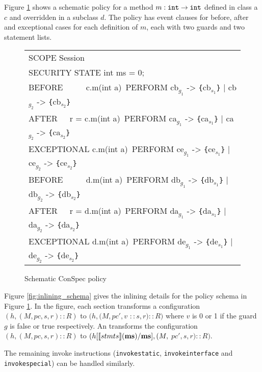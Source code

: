 \documentclass[10pt,twocolumn]{article}
\newcommand{\MS}{{\bf ms}}
\begin{document}
Figure \ref{fig:schematic_conspec} shows a schematic policy for a method $m : {\tt int} \rightarrow {\tt int}$ defined in class a $c$ and overridden in a subclass $d$. The policy has event clauses for {\sc before}, {\sc after} and {\sc exceptional} cases for each definition of $m$, each with two guards and two statement lists. 
\begin{figure}[h]
\centering
{\scriptsize\ttfamily
\begin{tabular}{@{}l@{}}
SCOPE Session\\
SECURITY STATE int ms = 0; \\[2mm]
BEFORE~~~~~ c.m(int a)\
PERFORM cb$_{g_1}$ -> \verb+{+cb$_{s_1}$\verb+}+ | cb$_{g_2}$  ->  \verb+{+cb$_{s_2}$\verb+}+ \\
AFTER~~~r = c.m(int a)\
PERFORM ca$_{g_1}$ -> \verb+{+ca$_{s_1}$\verb+}+ | ca$_{g_2}$  ->  \verb+{+ca$_{s_2}$\verb+}+ \\
EXCEPTIONAL c.m(int a)\
PERFORM ce$_{g_1}$ -> \verb+{+ce$_{s_1}$\verb+}+ | ce$_{g_2}$  ->  \verb+{+ce$_{s_2}$\verb+}+ \\[2mm]
BEFORE~~~~~ d.m(int a)\
PERFORM db$_{g_1}$ -> \verb+{+db$_{s_1}$\verb+}+ | db$_{g_2}$  ->  \verb+{+db$_{s_2}$\verb+}+ \\
AFTER~~~r = d.m(int a)\
PERFORM da$_{g_1}$ -> \verb+{+da$_{s_1}$\verb+}+ | da$_{g_2}$  ->  \verb+{+da$_{s_2}$\verb+}+ \\
EXCEPTIONAL d.m(int a)\
PERFORM de$_{g_1}$ -> \verb+{+de$_{s_1}$\verb+}+ | de$_{g_2}$  ->  \verb+{+de$_{s_2}$\verb+}+
\end{tabular}}
\caption{\label{fig:schematic_conspec} Schematic ConSpec policy}
\end{figure}

Figure \ref{fig:inlining_schema} gives the inlining details for the policy schema in Figure \ref{fig:schematic_conspec}. In the figure, each {\slshape \ttfamily [EVALUATE $g$]} section transforms a configuration $(h, (M, pc, s, r)::R)$ to $(h, (M, pc', v$ $::s, r)::R)$ where $v$ is 0 or 1 if the guard $g$ is false or true respectively. An {\slshape {}} transforms the configuration $(h, (M, pc, s, r)::R)$ to $(h[\llbracket stmts \rrbracket (\MS) /\MS],(M,$ $pc', s, r)::R)$.

The remaining invoke instructions ({\tt invokestatic}, {\tt in\-vokeinterface} and {\tt invokespecial}) can be handled similarly.
\end{document}
